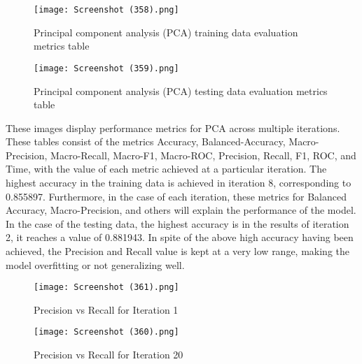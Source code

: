 \documentclass[journal]{IEEEtran}
\begin{document}
\begin{figure}[h!] %
    \centering
    \texttt{[image: Screenshot (358).png]}  %
    \caption{ Principal component analysis (PCA) training data evaluation
 metrics table}
    \label{fig:structure}
\end{figure}


\begin{figure}[h!] %
    \centering
    \texttt{[image: Screenshot (359).png]}  %
        \caption{ Principal component analysis (PCA) testing data evaluation
 metrics table}
    \label{fig:structure}
\end{figure}

These images display performance metrics for PCA across multiple iterations. These tables consist of the metrics Accuracy, Balanced-Accuracy, Macro-Precision, Macro-Recall, Macro-F1, Macro-ROC, Precision, Recall, F1, ROC, and Time, with the value of each metric achieved at a particular iteration. The highest accuracy in the training data is achieved in iteration 8, corresponding to 0.855897. Furthermore, in the case of each iteration, these metrics for Balanced Accuracy, Macro-Precision, and others will explain the performance of the model. In the case of the testing data, the highest accuracy is in the results of iteration 2, it reaches a value of 0.881943. In spite of the above high accuracy having been achieved, the Precision and Recall value is kept at a very low range, making the model overfitting or not generalizing well.


\begin{figure}[h!] %
    \centering
    \texttt{[image: Screenshot (361).png]}  %
        \caption{Precision vs Recall for Iteration 1}
    \label{fig:graph}
\end{figure}

\begin{figure}[h!] %
    \centering
    \texttt{[image: Screenshot (360).png]}  %
        \caption{Precision vs Recall for Iteration 20}
    \label{fig:graph}
\end{figure}
\end{document}
